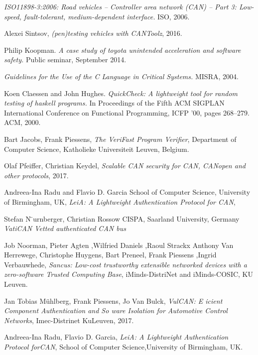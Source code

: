 \documentclass[11pt]{article}
\begin{document}
\begin{thebibliography}{10}
	\textit{ISO11898-3:2006: Road vehicles -- Controller area network (CAN) -- Part 3: Low-speed, fault-tolerant, medium-dependent interface.} ISO, 2006.
	
	Alexei Sintsov, 
	\textit{(pen)testing vehicles with CANToolz},
	2016.
	
	Philip Koopman. \textit{A case study of toyota unintended acceleration and software safety.} Public seminar, September 2014.
	
	\textit{Guidelines for the Use of the C Language in Critical Systems.} MISRA, 2004.
	
	Koen Claessen and John Hughes. 
	\textit{QuickCheck: A lightweight tool for random testing of haskell programs.} In Proceedings of the Fifth ACM SIGPLAN International Conference on Functional Programming, ICFP ’00, pages 268–279. ACM, 2000.
	
	Bart Jacobs, Frank Piessens,
	\textit{The VeriFast Program Verifier}, Department of Computer Science, Katholieke Universiteit Leuven, Belgium.
	
	Olaf Pfeiffer, Christian Keydel, 
	\textit{Scalable CAN security for CAN, CANopen and other protocols}, 2017.
	
	Andreea-Ina Radu and Flavio D. Garcia
	School of Computer Science,
	University of Birmingham, UK, 
	\textit{LeiA: A Lightweight Authentication Protocol for CAN},
	
	Stefan N ̈urnberger, Christian Rossow
	CISPA, Saarland University, Germany
	\textit{VatiCAN Vetted authenticated CAN bus}
	
	Job Noorman, Pieter Agten ,Wilfried Daniels ,Raoul Strackx
	Anthony Van Herrewege, Christophe Huygens, Bart Preneel, Frank Piessens
    ,Ingrid Verbauwhede, \textit{Sancus: Low-cost trustworthy extensible networked devices with a zero-software Trusted Computing Base}, iMinds-DistriNet and iMinds-COSIC, KU Leuven.
    
    Jan Tobias Mühlberg, Frank Piessens, Jo Van Bulck,
    \textit{VulCAN: E icient Component Authentication and So ware Isolation for Automotive Control Networks}, Imec-Distrinet KuLeuven, 2017.
    
    Andreea-Ina Radu, Flavio D. Garcia,
    \textit{LeiA: A Lightweight Authentication Protocol forCAN},
    School of Computer Science,University of Birmingham, UK.
    

\end{thebibliography}
\end{document}
